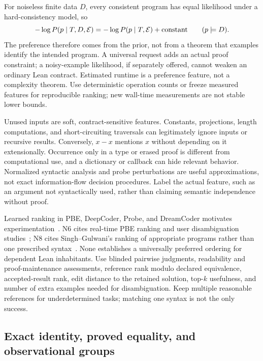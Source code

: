 For noiseless finite data $D$, every consistent program has equal likelihood under a hard-consistency model, so
\[
 -\log P(p\mid T,D,\mathcal{E})
 =-\log P(p\mid T,\mathcal{E})+\text{constant}\qquad(p\models D).
\]
The preference therefore comes from the prior, not from a theorem that examples identify the intended program. A universal request adds an actual proof constraint; a noisy-example likelihood, if separately offered, cannot weaken an ordinary Lean contract. Estimated runtime is a preference feature, not a complexity theorem. Use deterministic operation counts or freeze measured features for reproducible ranking; new wall-time measurements are not stable lower bounds.

Unused inputs are soft, contract-sensitive features. Constants, projections, length computations, and short-circuiting traversals can legitimately ignore inputs or recursive results. Conversely, $x-x$ mentions $x$ without depending on it extensionally. Occurrence only in a type or erased proof is different from computational use, and a dictionary or callback can hide relevant behavior. Normalized syntactic analysis and probe perturbations are useful approximations, not exact information-flow decision procedures. Label the actual feature, such as an argument not syntactically used, rather than claiming semantic independence without proof.

Learned ranking in PBE, DeepCoder, Probe, and DreamCoder motivates experimentation~\cite{deepcoder,probe,dreamcoder}. N6 cites real-time PBE ranking and user disambiguation studies~\cite{rankingstudy,pbeinteraction}; N8 cites Singh--Gulwani's ranking of appropriate programs rather than one prescribed syntax~\cite{ranking}. None establishes a universally preferred ordering for dependent Lean inhabitants. Use blinded pairwise judgments, readability and proof-maintenance assessments, reference rank modulo declared equivalence, accepted-result rank, edit distance to the retained solution, top-$k$ usefulness, and number of extra examples needed for disambiguation. Keep multiple reasonable references for underdetermined tasks; matching one syntax is not the only success.

\subsection{Exact identity, proved equality, and observational groups}\label{sec:ranking-equivalence}

